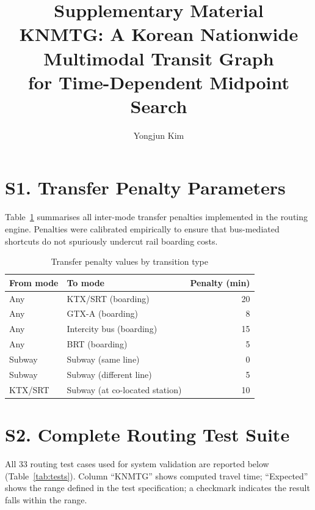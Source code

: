 \documentclass[12pt]{article}
\title{\textbf{Supplementary Material}\\[6pt]
KNMTG: A Korean Nationwide Multimodal Transit Graph\\
for Time-Dependent Midpoint Search}
\author[1]{Yongjun Kim}
\affil[1]{Department of Software, Ajou University, Suwon 16499, Republic of Korea}
\date{}
\begin{document}
\maketitle

\section*{S1. Transfer Penalty Parameters}

Table~\ref{tab:transfer} summarises all inter-mode transfer penalties implemented
in the routing engine. Penalties were calibrated empirically to ensure that
bus-mediated shortcuts do not spuriously undercut rail boarding costs.

\begin{table}[h]
\centering
\caption{Transfer penalty values by transition type}
\label{tab:transfer}
\begin{tabular}{llr}
\toprule
From mode & To mode & Penalty (min) \\
\midrule
Any & KTX/SRT (boarding) & 20 \\
Any & GTX-A (boarding) & 8 \\
Any & Intercity bus (boarding) & 15 \\
Any & BRT (boarding) & 5 \\
Subway & Subway (same line) & 0 \\
Subway & Subway (different line) & 5 \\
KTX/SRT & Subway (at co-located station) & 10 \\
\bottomrule
\end{tabular}
\end{table}

\section*{S2. Complete Routing Test Suite}

All 33 routing test cases used for system validation are reported below
(Table~\ref{tab:tests}). Column ``KNMTG'' shows computed travel time;
``Expected'' shows the range defined in the test specification; a checkmark
indicates the result falls within the range.
\end{document}
